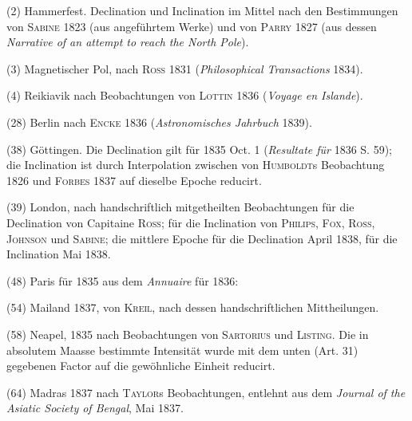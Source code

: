 (2) Hammerfest. Declination und Inclination im Mittel nach den Bestimmungen von \textsc{Sabine} 1823 (aus angeführtem Werke) und von \textsc{Parry} 1827 (aus dessen \textit{Narrative of an attempt to reach the North Pole}).

(3) Magnetischer Pol, nach \textsc{Ross} 1831 (\textit{Philosophical Transactions} 1834).

(4) Reikiavik nach Beobachtungen von \textsc{Lottin} 1836 (\textit{Voyage en Islande}).

(28) Berlin nach \textsc{Encke} 1836 (\textit{Astronomisches Jahrbuch} 1839).

(38) Göttingen. Die Declination gilt für 1835 Oct. 1 (\textit{Resultate für} 1836 S. 59); die Inclination ist durch Interpolation zwischen von \textsc{Humboldt}s Beobachtung 1826 und \textsc{Forbes} 1837 auf dieselbe Epoche reducirt.

(39) London, nach handschriftlich mitgetheilten Beobachtungen für die Declination von Capitaine \textsc{Ross}; für die Inclination von \textsc{Philips}, \textsc{Fox}, \textsc{Ross}, \textsc{Johnson} und \textsc{Sabine}; die mittlere Epoche für die Declination April 1838, für die Inclination Mai 1838.

(48) Paris für 1835 aus dem \textit{Annuaire} für 1836:

(54) Mailand 1837, von \textsc{Kreil}, nach dessen handschriftlichen Mittheilungen.

(58) Neapel, 1835 nach Beobachtungen von \textsc{Sartorius} und \textsc{Listing}. Die in absolutem Maasse bestimmte Intensität wurde mit dem unten (Art. 31) gegebenen Factor auf die gewöhnliche Einheit reducirt.

(64) Madras 1837 nach \textsc{Taylor}s Beobachtungen, entlehnt aus dem \textit{Journal of the Asiatic Society of Bengal}, Mai 1837.
\par\clearpage
